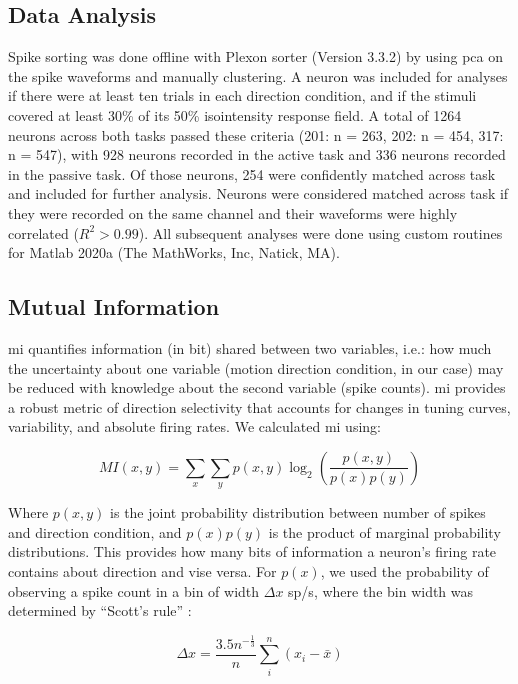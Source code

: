 \subsection*{Data Analysis} 
Spike sorting was done offline with Plexon sorter (Version 3.3.2) by using \gls{pca} on the spike waveforms and manually clustering. A neuron was included for analyses if there were at least ten trials in each direction condition, and if the stimuli covered at least 30\% of its 50\% isointensity response field. A total of 1264 neurons across both tasks passed these criteria (201: n = 263, 202: n = 454, 317: n = 547), with 928 neurons recorded in the active task and 336 neurons recorded in the passive task. Of those neurons, 254 were confidently matched across task and included for further analysis. Neurons were considered matched across task if they were recorded on the same channel and their waveforms were highly correlated ($R^2>0.99$). All subsequent analyses were done using custom routines for Matlab 2020a (The MathWorks, Inc, Natick, MA).

\subsection*{Mutual Information} 
\Gls{mi} quantifies information (in bit) shared between two variables, i.e.: how much the uncertainty about one variable (motion direction condition, in our case) may be reduced with knowledge about the second variable (spike counts). \Gls{mi} provides a robust metric of direction selectivity that accounts for changes in tuning curves, variability, and absolute firing rates. We calculated \gls{mi} using:

\begin{equation}
MI(x,y)= \sum_x \sum_y p(x,y) \log_2\left(\frac{p(x,y)}{p(x) p(y)}\right)
\end{equation}

Where $p(x,y)$ is the joint probability distribution between number of spikes and direction condition, and $p(x) p(y)$ is the product of marginal probability distributions. 
This provides how many bits of information a neuron's firing rate contains about direction and vise versa. 
For $p(x)$, we used the probability of observing a spike count in a bin of width $\Delta x$ sp/s, where the bin width was determined by ``Scott's rule'' \parencite{scottsRule}:

\begin{equation}\label{eq:spikebin}
\Delta x = \frac{3.5 n^{-\frac{1}{3}}}{n} \sum_{i}^{n}\left( x_i-\bar{x} \right)
\end{equation}

